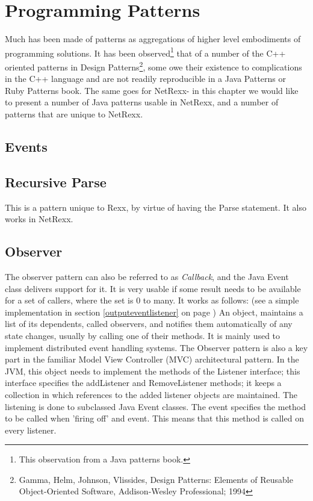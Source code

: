 \chapter{Programming Patterns}
Much has been made of patterns as aggregations of higher level
embodiments of programming solutions.  It has been
observed\footnote{This observation from a Java patterns book.} that of a
number of the C++ oriented patterns in Design Patterns\footnote{Gamma,
Helm, Johnson, Vlissides, Design
Patterns: Elements of Reusable Object-Oriented Software,
Addison-Wesley Professional; 1994}, some owe their existence
to complications in the C++ language and are not readily reproducible
in a Java Patterns or Ruby Patterns book. The same goes for NetRexx-
in this chapter we would like to present a number of Java patterns
usable in NetRexx, and a number of patterns that are unique to NetRexx.
\section{Events}\label{events}

\section{Recursive Parse}
This is a pattern unique to Rexx, by virtue of \Rexx{} having the Parse
statement. It also works in NetRexx.

\section{Observer}
The observer pattern can also be referred to as \emph{Callback}, and
the Java Event class delivers support for it. It is very usable if
some result needs to be available for a set of callers, where the set
is 0 to many. It works as follows: (see a simple implementation in
section \ref{outputeventlistener} on page
\pageref{outputeventlistener})
An object, maintains a list of its dependents, called observers, and
notifies them automatically of any state changes, usually by calling
one of their methods. It is mainly used to implement distributed event
handling systems. The Observer pattern is also a key part in the
familiar Model View Controller (MVC) architectural pattern. In the
JVM, this object needs to implement the methods of the Listener
interface; this interface specifies the addListener and RemoveListener
methods; it keeps a collection in which references to the added
listener objects are maintained. The listening is done to subclassed
Java Event classes. The event specifies the method to be called when
'firing off' and event. This means that this method is called on every
listener.

